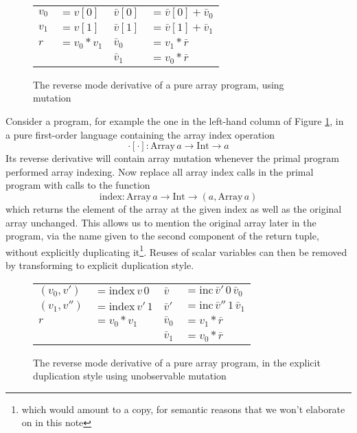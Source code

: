\documentclass[12pt]{article}
\begin{document}
\newcommand{\indexL}{\mathrm{index}}
\newcommand{\incL}{\mathrm{inc}}

\begin{figure}[t]
\center
\begin{tabular}[t]{ll|ll}
  $v_0$ & $= v[0]$
  &
  $\bar{v}[0]$ & $ = \bar{v}[0] + \bar{v}_0$
  \\
  
  $v_1$ & $ = v[1]$
  &
  $\bar{v}[1]$ & $ = \bar{v}[1] + \bar{v}_1$
  \\

  $r$ & $= v_0 * v_1$
  &
  $\bar{v}_0$ & $ = v_1 * \bar{r}$
  \\

  & &
  $\bar{v}_1$ & $ = v_0 * \bar{r}$
  \\
\end{tabular}
\caption{\label{array-program-mutating} The reverse mode derivative of
  a pure array program, using mutation}
\end{figure}

Consider a program, for example the one in the left-hand column of
Figure \ref{array-program-mutating}, in a pure first-order language
containing the array index operation
\[
\cdot[\cdot] : \mathrm{Array} \, a \to \mathrm{Int} \to a
\]
Its reverse derivative will contain array mutation whenever the primal
program performed array indexing.  Now replace all array index calls
in the primal program with calls to the function
\[
\indexL : \mathrm{Array} \, a \to \mathrm{Int} \to (a, \mathrm{Array}
\, a)
\]
which returns the element of the array at the given index as well as
the original array unchanged.  This allows us to mention the original
array later in the program, via the name given to the second component
of the return tuple, without explicitly duplicating it\footnote{which
  would amount to a copy, for semantic reasons that we won't elaborate
  on in this note}.  Reuses of scalar variables can then be removed by
transforming to explicit duplication style.

\begin{figure}[t]
\center
\begin{tabular}[t]{ll|ll}
  $(v_0, v')$ & $ = \indexL \, v \, 0$
  &
  $\bar{v}$ & $ = \mathrm{inc} \, \bar{v}' \, 0 \, \bar{v}_0$
  \\
  
  $(v_1, v'')$ & $ = \indexL \, v' \, 1$
  &
  $\bar{v}'$ & $ = \mathrm{inc} \, \bar{v}'' \, 1 \, \bar{v}_1$
  \\

  $r$ & $ = v_0 * v_1$
  &
  $\bar{v}_0$ & $ = v_1 * \bar{r}$
  \\

  & &
  $\bar{v}_1$ & $ = v_0 * \bar{r}$
  \\
\end{tabular}
\caption{\label{array-program-dup} The reverse mode derivative of
  a pure array program, in the explicit duplication style using
  unobservable mutation}
\end{figure}
\end{document}
